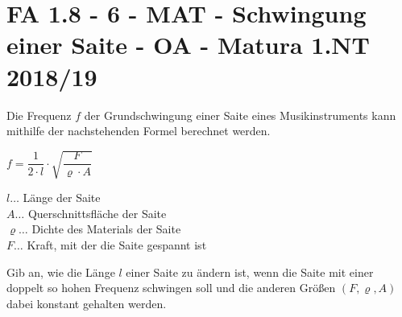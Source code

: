 \section{FA 1.8 - 6 - MAT - Schwingung einer Saite - OA - Matura 1.NT 2018/19}

\begin{beispiel}[FA 1.8]{1}
Die Frequenz $f$ der Grundschwingung einer Saite eines Musikinstruments kann mithilfe der nachstehenden Formel berechnet werden.

$f=\dfrac{1}{2\cdot l}\cdot\sqrt{\dfrac{F}{\varrho\cdot A}}$\leer

$l\ldots$ Länge der Saite\\
$A\ldots$ Querschnittsfläche der Saite\\
$\varrho\ldots$ Dichte des Materials der Saite\\
$F\ldots$ Kraft, mit der die Saite gespannt ist\leer

Gib an, wie die Länge $l$ einer Saite zu ändern ist, wenn die Saite mit einer doppelt so hohen Frequenz schwingen soll und die anderen Größen $(F,\varrho, A)$ dabei konstant gehalten werden.

\end{beispiel}